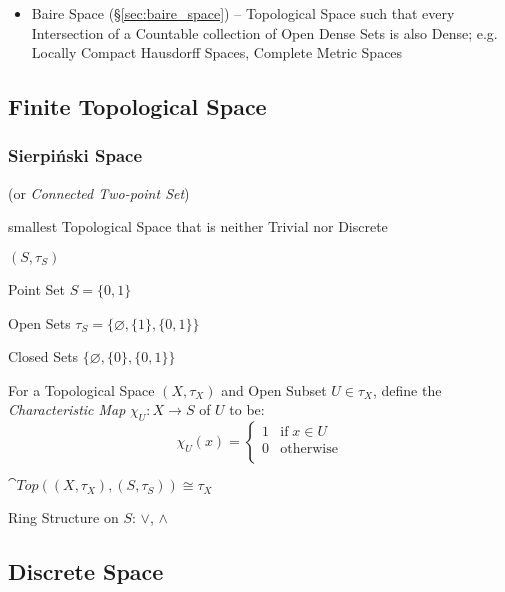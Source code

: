 \begin{itemize}
  \item Baire Space (\S\ref{sec:baire_space}) -- Topological Space such that
    every Intersection of a Countable collection of Open Dense Sets is also
    Dense; e.g. Locally Compact Hausdorff Spaces, Complete Metric Spaces
\end{itemize}



\subsection{Finite Topological Space}\label{sec:finite_topological_space}

\subsubsection{Sierpi\'nski Space}\label{sec:sierpinski_space}

(or \emph{Connected Two-point Set})

smallest Topological Space that is neither Trivial nor Discrete

$(S,\tau_S)$

Point Set $S = \{0,1\}$

Open Sets $\tau_S = \{\varnothing, \{1\}, \{0,1\}\}$

Closed Sets $\{\varnothing, \{0\}, \{0,1\}\}$

For a Topological Space $(X,\tau_X)$ and Open Subset $U \in \tau_X$,
define the \emph{Characteristic Map} $\chi_U : X \rightarrow S$ of $U$ to be:
\[
  \chi_U (x) =
  \begin{cases}
    1  & \text{if}\; x \in U \\
    0  & \text{otherwise} \\
  \end{cases}
\]

$\cat{Top}((X,\tau_X),(S,\tau_S)) \cong \tau_X$

Ring Structure on $S$: $\vee$, $\wedge$



\subsection{Discrete Space}\label{sec:discrete_space}

